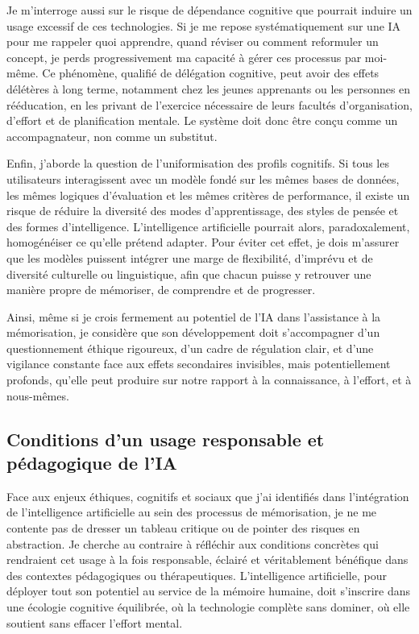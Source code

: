 \documentclass[11pt,a4paper]{report}
\begin{document}
Je m’interroge aussi sur le risque de dépendance cognitive que pourrait induire un usage excessif de ces technologies. Si je me repose systématiquement sur une IA pour me rappeler quoi apprendre, quand réviser ou comment reformuler un concept, je perds progressivement ma capacité à gérer ces processus par moi-même. Ce phénomène, qualifié de délégation cognitive, peut avoir des effets délétères à long terme, notamment chez les jeunes apprenants ou les personnes en rééducation, en les privant de l’exercice nécessaire de leurs facultés d’organisation, d’effort et de planification mentale. Le système doit donc être conçu comme un accompagnateur, non comme un substitut.

Enfin, j’aborde la question de l’uniformisation des profils cognitifs. Si tous les utilisateurs interagissent avec un modèle fondé sur les mêmes bases de données, les mêmes logiques d’évaluation et les mêmes critères de performance, il existe un risque de réduire la diversité des modes d’apprentissage, des styles de pensée et des formes d’intelligence. L’intelligence artificielle pourrait alors, paradoxalement, homogénéiser ce qu’elle prétend adapter. Pour éviter cet effet, je dois m’assurer que les modèles puissent intégrer une marge de flexibilité, d’imprévu et de diversité culturelle ou linguistique, afin que chacun puisse y retrouver une manière propre de mémoriser, de comprendre et de progresser.

Ainsi, même si je crois fermement au potentiel de l’IA dans l’assistance à la mémorisation, je considère que son développement doit s’accompagner d’un questionnement éthique rigoureux, d’un cadre de régulation clair, et d’une vigilance constante face aux effets secondaires invisibles, mais potentiellement profonds, qu’elle peut produire sur notre rapport à la connaissance, à l’effort, et à nous-mêmes.

\subsection{Conditions d’un usage responsable et pédagogique de l’IA}

Face aux enjeux éthiques, cognitifs et sociaux que j’ai identifiés dans l’intégration de l’intelligence artificielle au sein des processus de mémorisation, je ne me contente pas de dresser un tableau critique ou de pointer des risques en abstraction. Je cherche au contraire à réfléchir aux conditions concrètes qui rendraient cet usage à la fois responsable, éclairé et véritablement bénéfique dans des contextes pédagogiques ou thérapeutiques. L’intelligence artificielle, pour déployer tout son potentiel au service de la mémoire humaine, doit s’inscrire dans une écologie cognitive équilibrée, où la technologie complète sans dominer, où elle soutient sans effacer l’effort mental.
\end{document}

